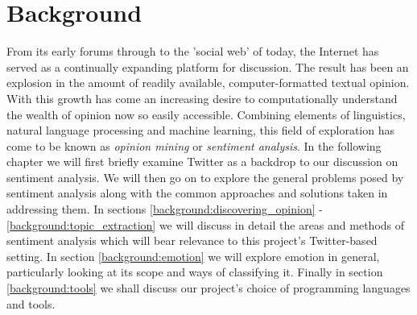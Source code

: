

\chapter{Background}
\label{background}

From its early forums through to the 'social web' of today, the Internet has served as a continually expanding platform for discussion. The result has been an explosion in the amount of readily available, computer-formatted textual opinion. With this growth has come an increasing desire to computationally understand the wealth of opinion now so easily accessible. Combining elements of linguistics, natural language processing and machine learning, this field of exploration has come to be known as \emph{opinion mining} or \emph{sentiment analysis}. In the following chapter we will first briefly examine Twitter as a backdrop to our discussion on sentiment analysis. We will then go on to explore the general problems posed by sentiment analysis along with the common approaches and solutions taken in addressing them. In sections \ref{background:discovering_opinion} - \ref{background:topic_extraction} we will discuss in detail the areas and methods of sentiment analysis which will bear relevance to this project's Twitter-based setting. In section \ref{background:emotion} we will explore emotion in general, particularly looking at its scope and ways of classifying it. Finally in section \ref{background:tools} we shall discuss our project's choice of programming languages and tools.

